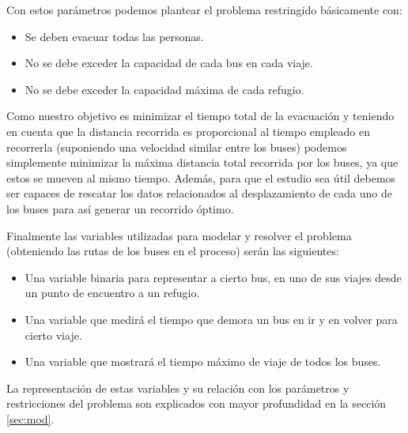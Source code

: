 \documentclass[letter, 10pt]{article}
\begin{document}
    Con estos parámetros podemos plantear el problema restringido básicamente
    con:
    \begin{itemize}
        \item Se deben evacuar todas las personas.
        \item No se debe exceder la capacidad de cada bus en cada viaje.
        \item No se debe exceder la capacidad máxima de cada refugio.
    \end{itemize}

    Como nuestro objetivo es minimizar el tiempo total de la evacuación y
    teniendo en cuenta que la distancia recorrida es proporcional al tiempo
    empleado en recorrerla (suponiendo una velocidad similar entre los buses)
    podemos simplemente minimizar la máxima distancia total recorrida por los
    buses, ya que estos se mueven al mismo tiempo. Además, para que el estudio
    sea útil debemos ser capaces de rescatar los datos relacionados al
    desplazamiento de cada uno de los buses para así generar un recorrido 
    óptimo.

    Finalmente las variables utilizadas para modelar y resolver el problema
    (obteniendo las rutas de los buses en el proceso) serán las siguientes:
    \begin{itemize}
        \item
            Una variable binaria para representar a cierto bus, en uno de sus
            viajes desde un punto de encuentro a un refugio.
        \item
            Una variable que medirá el tiempo que demora un bus en ir y en
            volver para cierto viaje.
        \item
            Una variable que mostrará el tiempo máximo de viaje de todos los
            buses.
    \end{itemize}
    La representación de estas variables y su relación con los parámetros y
    restricciones del problema son explicados con mayor profundidad en la
    sección \ref{sec:mod}.
\end{document}
